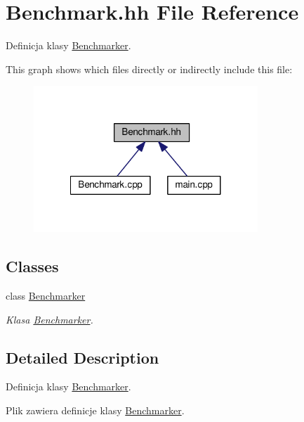 \hypertarget{a00009}{}\section{Benchmark.\+hh File Reference}
\label{a00009}


Definicja klasy \hyperlink{a00002}{Benchmarker}.  


This graph shows which files directly or indirectly include this file\+:\nopagebreak
\begin{figure}[H]
\begin{center}
\leavevmode
\includegraphics[width=239pt]{a00023}
\end{center}
\end{figure}
\subsection*{Classes}
\begin{DoxyCompactItemize}
\item 
class \hyperlink{a00002}{Benchmarker}
\begin{DoxyCompactList}\small\item\em Klasa \hyperlink{a00002}{Benchmarker}. \end{DoxyCompactList}\end{DoxyCompactItemize}


\subsection{Detailed Description}
Definicja klasy \hyperlink{a00002}{Benchmarker}. 

Plik zawiera definicje klasy \hyperlink{a00002}{Benchmarker}. 